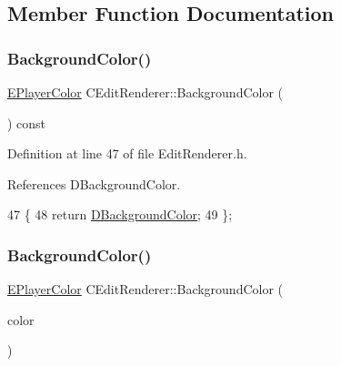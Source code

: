\subsection{Member Function Documentation}
\hypertarget{classCEditRenderer_a531e5a92494375020328936efdf239d1}{}\label{classCEditRenderer_a531e5a92494375020328936efdf239d1} 
\subsubsection{\texorpdfstring{Background\+Color()}{BackgroundColor()}\hspace{0.1cm}{\footnotesize\ttfamily [1/2]}}
{\footnotesize\ttfamily \hyperlink{GameDataTypes_8h_aafb0ca75933357ff28a6d7efbdd7602f}{E\+Player\+Color} C\+Edit\+Renderer\+::\+Background\+Color (\begin{DoxyParamCaption}{ }\end{DoxyParamCaption}) const\hspace{0.3cm}{\ttfamily [inline]}}



Definition at line 47 of file Edit\+Renderer.\+h.



References D\+Background\+Color.


\begin{DoxyCode}
47                                             \{
48             \textcolor{keywordflow}{return} \hyperlink{classCEditRenderer_a7e5e1b18db4c53fe288c200aed673ccf}{DBackgroundColor};   
49         \};
\end{DoxyCode}
\hypertarget{classCEditRenderer_afc5aed55b1384142fbd096c7ffe2476f}{}\label{classCEditRenderer_afc5aed55b1384142fbd096c7ffe2476f} 
\subsubsection{\texorpdfstring{Background\+Color()}{BackgroundColor()}\hspace{0.1cm}{\footnotesize\ttfamily [2/2]}}
{\footnotesize\ttfamily \hyperlink{GameDataTypes_8h_aafb0ca75933357ff28a6d7efbdd7602f}{E\+Player\+Color} C\+Edit\+Renderer\+::\+Background\+Color (\begin{DoxyParamCaption}\item[{\hyperlink{GameDataTypes_8h_aafb0ca75933357ff28a6d7efbdd7602f}{E\+Player\+Color}}]{color }\end{DoxyParamCaption})\hspace{0.3cm}{\ttfamily [inline]}}



